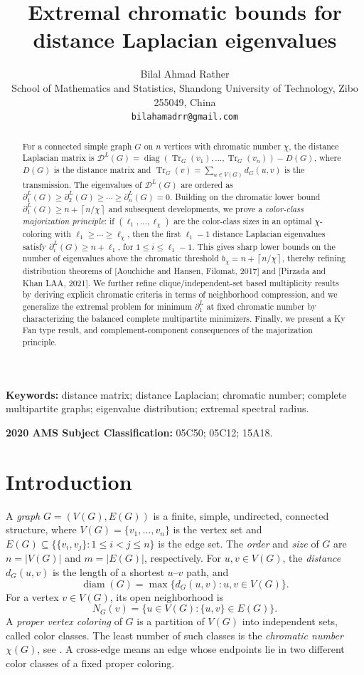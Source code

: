 \documentclass[12pt]{article}
\title{Extremal chromatic bounds for distance Laplacian eigenvalues}
\author{
    {\small Bilal Ahmad Rather}\\[2mm]
    {\small School of Mathematics and Statistics, Shandong University of Technology, Zibo 255049, China}\\
    \texttt{bilahamadrr@gmail.com}
}
\date{}
\newcommand{\DL}{\mathcal{D}^{L}}
\newcommand{\ceil}[1]{\left\lceil #1 \right\rceil}
\newcommand{\Tr}{\operatorname{Tr}}
\newcommand{\diam}{\operatorname{diam}}
\theoremstyle{plain}
\theoremstyle{definition}
\begin{document}
\maketitle

\begin{abstract}
For a connected simple graph $G$ on $n$ vertices with chromatic number $\chi$, the distance Laplacian matrix is
$\DL(G)=\operatorname{diag}(\Tr_G(v_1),\dots,\Tr_G(v_n))-D(G)$, where $D(G)$ is the distance matrix and
$\Tr_G(v)=\sum_{u\in V(G)} d_G(u,v)$ is the transmission. The eigenvalues of $\DL(G)$ are ordered as
$\partial^{L}_1(G)\ge \partial^{L}_2(G)\ge \cdots \ge \partial^{L}_n(G)=0$.
Building on the chromatic lower bound $\partial^{L}_1(G)\ge n+\ceil{n/\chi}$ and subsequent developments, we prove a
\emph{color-class majorization principle}: if $(\ell_1,\dots,\ell_\chi)$ are the color-class sizes in an optimal
$\chi$-coloring with $\ell_1\ge\cdots\ge\ell_\chi$, then the first $\ell_1-1$ distance Laplacian eigenvalues satisfy
$\partial^{L}_i(G)\ge n+\ell_1$, for $1\le i\le \ell_1-1$. This gives sharp lower bounds on the number of eigenvalues
above the chromatic threshold $b_\chi=n+\ceil{n/\chi}$, thereby refining distribution theorems of [Aouchiche and Hansen, Filomat, 2017] and [Pirzada and Khan LAA, 2021]. We further refine clique/independent-set based multiplicity results by
deriving explicit chromatic criteria in terms of neighborhood compression, and we generalize the extremal problem for minimum
$\partial^{L}_1$ at fixed chromatic number by characterizing the balanced complete multipartite minimizers. Finally, we present a  Ky Fan type result, and complement-component consequences of the majorization principle. 
\end{abstract}

\medskip
\noindent\textbf{Keywords:} distance matrix; distance Laplacian; chromatic number; complete multipartite graphs; eigenvalue distribution; extremal spectral radius.

\smallskip
\noindent\textbf{2020 AMS Subject Classification:} 05C50; 05C12; 15A18.

\section{Introduction}

A \emph{graph} $G=(V(G),E(G))$ is a finite, simple, undirected, connected structure, where
$V(G)=\{v_1,\dots,v_n\}$ is the vertex set and
$E(G)\subseteq \{\{v_i,v_j\}:1\le i<j\le n\}$ is the edge set. The \emph{order} and \emph{size} of $G$ are
$n=|V(G)|$ and $m=|E(G)|$, respectively. For $u,v\in V(G)$, the \emph{distance} $d_G(u,v)$ is the length of a shortest
$u$--$v$ path, and
\[
    \diam(G)=\max\{d_G(u,v):u,v\in V(G)\}.
\]
For a vertex $v\in V(G)$, its open neighborhood is
\[
    N_G(v)=\{u\in V(G):\{u,v\}\in E(G)\}.
\]
A \emph{proper vertex coloring} of $G$ is a partition of $V(G)$ into independent sets, called color classes. The least number
of such classes is the \emph{chromatic number} $\chi(G)$, see \cite{BrouwerHaemers2012,CvetkovicDoobSachs1995}. A cross-edge means an edge whose endpoints lie in two different color classes of a fixed proper coloring.
\end{document}
